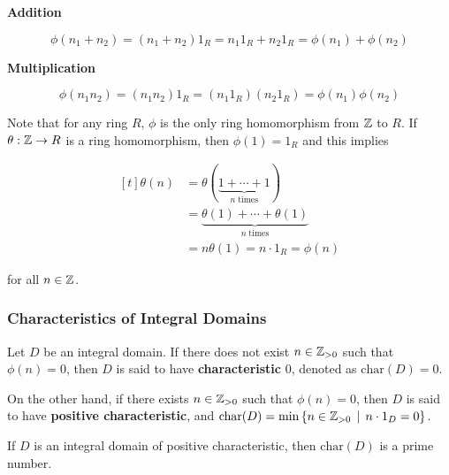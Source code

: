 \documentclass[a4paper,12pt]{article}
\begin{document}
\begin{exm}
\begin{alist}
\begin{rlist}
      \item \textbf{Addition}

      $$\phi(n_{1}+n_{2})=(n_{1}+n_{2})1_{R}=n_{1}1_{R}+n_{2}1_{R}=\phi(n_{1})+\phi(n_{2})$$

      \item \textbf{Multiplication}

      $$\phi(n_{1}n_{2})=(n_{1}n_{2})1_{R}=(n_{1}1_{R})(n_{2}1_{R})=\phi(n_{1})\phi(n_{2})$$
    \end{rlist}

    Note that for any ring $R$, $\phi$ is the only ring homomorphism from $\mathbb{Z}$ to $R$. If $\theta:\mathbb{Z}\to R$ is a ring homomorphism, then $\phi(1)=1_{R}$ and this implies

    $$\begin{aligned}[t]
      \theta(n)&=\theta(\underset{n\;\text{times}}{\underbrace{1+\cdots+1}})\\
      &=\underset{n\;\text{times}}{\underbrace{\theta(1)+\cdots+\theta(1)}}\\
      &=n\theta(1)=n\cdot 1_{R}=\phi(n)
    \end{aligned}$$\s

    for all $n\in\mathbb{Z}$.
  \end{alist}
\end{exm}

\subsubsection{Characteristics of Integral Domains}
\begin{dft}
  Let $D$ be an integral domain. If there does not exist $n\in\mathbb{Z}_{>0}$ such that $\phi(n)=0$, then $D$ is said to have \textbf{characteristic} $0$, denoted as $\mathrm{char}(D)=0$.\n

  On the other hand, if there exists $n\in\mathbb{Z}_{>0}$ such that $\phi(n)=0$, then $D$ is said to have \textbf{positive characteristic}, and $\mathrm{char}(D)=\min\left\{ n\in\mathbb{Z}_{>0}\,\mid\, n\cdot 1_{D}=0\right\}$.
\end{dft}\n

\begin{pst}
  If $D$ is an integral domain of positive characteristic, then $\mathrm{char}(D)$ is a prime number.
\end{pst}\n
\end{document}
